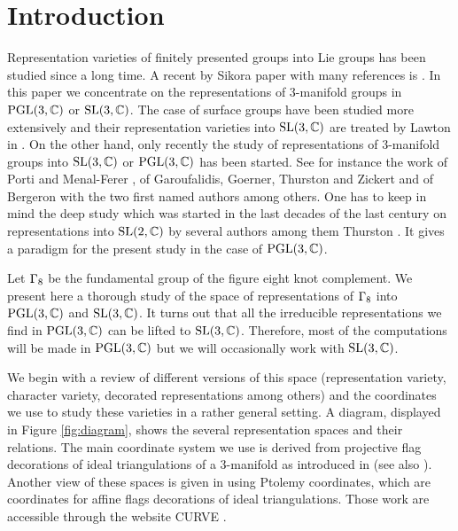 \section*{Introduction}

Representation varieties of finitely presented  groups into Lie groups has been studied since a long time.  A recent by Sikora paper with many references
is  \cite{Sikora}.  In this paper we concentrate on the representations of 3-manifold groups in $\textrm{PGL}(3,\mathbb{C})$ or $\textrm{SL}(3,\mathbb{C})$.
  The case of surface groups have been studied more extensively and their  representation varieties
into $\textrm{SL}(3,\mathbb{C})$ are treated by Lawton in \cite{Lawton}.  On the other hand, only recently the study
of representations of 3-manifold groups into $\textrm{SL}(3,\mathbb{C})$ or  $\textrm{PGL}(3,\mathbb{C})$  has been started. See for instance the work of Porti and Menal-Ferer \cite{MF}, of Garoufalidis, Goerner, Thurston and Zickert \cite{GTZ,GGZ} and of Bergeron with the two first named authors \cite{BFG} among others.  One has to keep in mind
the deep study which was started in the last decades of the last century on representations into $\textrm{SL}(2,\mathbb{C})$ by several authors among them
Thurston \cite{Thurston}.  It gives a paradigm for the present study in the case of  $\textrm{PGL}(3,\mathbb{C})$.  

Let $\Gamma_{8}$ be the fundamental group of the figure eight knot complement. We present here a thorough study of the space of representations of $\Gamma_{8}$ into $\textrm{PGL}(3,\mathbb{C})$ and $\textrm{SL}(3,\mathbb{C})$.  It turns out that all the irreducible representations we find in  $\textrm{PGL}(3,\mathbb{C})$ can be lifted to $\textrm{SL}(3,\mathbb{C})$.  Therefore, most of the computations will be made in $\textrm{PGL}(3,\mathbb{C})$ but we will occasionally work with $\textrm{SL}(3,\mathbb{C})$.

We begin with a review of different versions of this space (representation variety, character variety, decorated representations among others) and the coordinates we use to study these varieties in a rather general setting.  A diagram, displayed in Figure \ref{fig:diagram}, shows the several representation spaces and their relations.  The main coordinate system we use is derived from projective flag decorations of ideal triangulations of a 3-manifold as introduced in \cite{BFG} (see also \cite{GGZ}).   Another view of these spaces is given in  \cite{Zickert-A-pol} using Ptolemy coordinates, which are coordinates for affine flags decorations of ideal triangulations. Those work are accessible through the website CURVE \cite{CURVE}.

